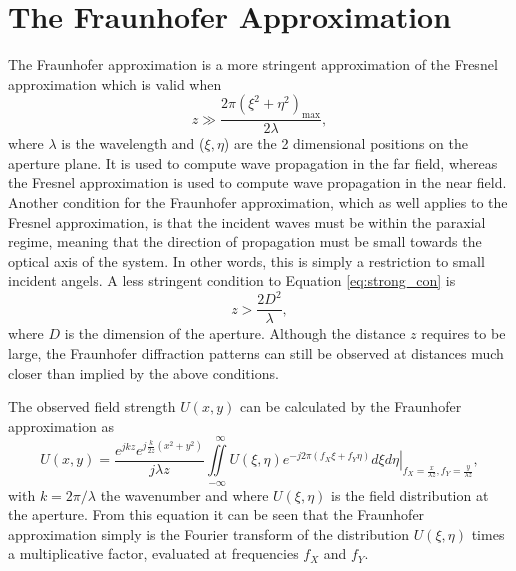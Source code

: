 \documentclass{article}
\begin{document}
\section{The Fraunhofer Approximation}
The Fraunhofer approximation is a more stringent approximation of the Fresnel approximation which is valid when
\begin{equation}
z\gg\frac{2\pi(\xi^2+\eta^2)_{\text{max}}}{2\lambda},
\label{eq:strong_con}
\end{equation}
where $\lambda$ is the wavelength and ($\xi,\eta$) are the 2 dimensional positions on the aperture plane. It is used to compute wave propagation in the far field, whereas the Fresnel approximation is used to compute wave propagation in the near field. Another condition for the Fraunhofer approximation, which as well applies to the Fresnel approximation, is that the incident waves must be within the paraxial regime, meaning that the direction of propagation must be small towards the optical axis of the system. In other words, this is simply a restriction to small incident angels. A less stringent condition to Equation \eqref{eq:strong_con} is 
\begin{equation}
z>\frac{2D^2}{\lambda},
\label{eq:normal_con}
\end{equation}
where $D$ is the dimension of the aperture. Although the distance $z$ requires to be large, the Fraunhofer diffraction patterns can still be observed at distances much closer than implied by the above conditions. 

The observed field strength $U(x,y)$ can be calculated by the Fraunhofer approximation as
\begin{equation}
U(x,y)=\frac{e^{jkz}e^{j\frac{k}{2z}(x^2+y^2)}}{j\lambda z}\iint\limits_{-\infty}^{~~~\infty} \left. U(\xi,\eta)e^{-j2\pi(f_X\xi+f_Y\eta)}d\xi d\eta \right|_{f_X=\frac{x}{\lambda z},f_Y=\frac{y}{\lambda z}},
\label{eq:fraunhofer}
\end{equation}
with $k=2\pi/\lambda$ the wavenumber and where $U(\xi,\eta)$ is the field distribution at the aperture. From this equation it can be seen that the Fraunhofer approximation simply is the Fourier transform of the distribution $U(\xi,\eta)$ times a multiplicative factor, evaluated at frequencies $f_X$ and $f_Y$.
\end{document}
